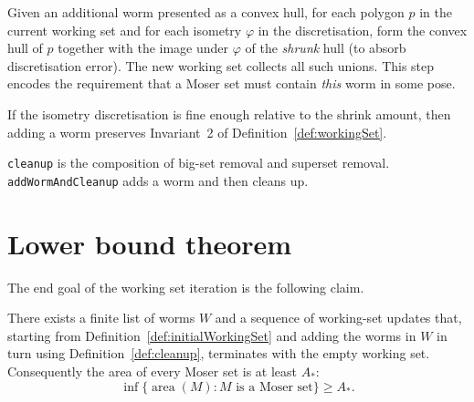 \begin{definition}
  \label{def:wormAdding}
  \leanok
  Given an additional worm presented as a convex hull, for each polygon
  $p$ in the current working set and for each isometry $\varphi$ in the
  discretisation, form the convex hull of $p$ together with the image
  under $\varphi$ of the \emph{shrunk} hull (to absorb discretisation
  error). The new working set collects all such unions. This step encodes
  the requirement that a Moser set must contain \emph{this} worm in some
  pose.
\end{definition}

\begin{proposition}
  \label{prop:wormAdding-correct}
  If the isometry discretisation is fine enough relative to the shrink
  amount, then adding a worm preserves Invariant~2 of
  Definition~\ref{def:workingSet}.
\end{proposition}

\begin{definition}
  \label{def:cleanup}
  \leanok
  \texttt{cleanup} is the composition of big-set removal and superset
  removal. \texttt{addWormAndCleanup} adds a worm and then cleans up.
\end{definition}

\chapter{Lower bound theorem}

The end goal of the working set iteration is the following claim.

\begin{theorem}
  \label{thm:lower-bound}
  There exists a finite list of worms $W$ and a sequence of working-set
  updates that, starting from
  Definition~\ref{def:initialWorkingSet} and adding the worms in $W$ in
  turn using
  Definition~\ref{def:cleanup}, terminates with the empty working set.
  Consequently the area of every Moser set is at least $A_*$:
  \[
    \inf \{ \operatorname{area}(M) : M \text{ is a Moser set}\} \ge A_*.
  \]
\end{theorem}

